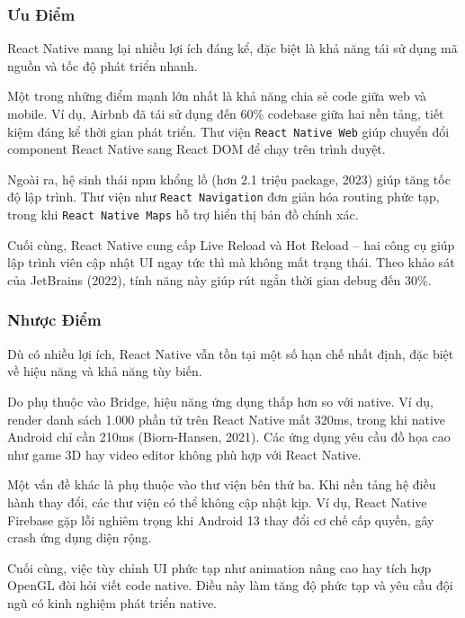 \subsubsection{Ưu Điểm}
\hspace*{1.5em}React Native mang lại nhiều lợi ích đáng kể, đặc biệt là khả năng tái sử dụng mã nguồn và tốc độ phát triển nhanh.

Một trong những điểm mạnh lớn nhất là khả năng chia sẻ code giữa web và mobile.  
Ví dụ, Airbnb đã tái sử dụng đến 60\% codebase giữa hai nền tảng, tiết kiệm đáng kể thời gian phát triển.  
Thư viện \texttt{React Native Web} giúp chuyển đổi component React Native sang React DOM để chạy trên trình duyệt.

Ngoài ra, hệ sinh thái npm khổng lồ (hơn 2.1 triệu package, 2023) giúp tăng tốc độ lập trình.  
Thư viện như \texttt{React Navigation} đơn giản hóa routing phức tạp, trong khi \texttt{React Native Maps} hỗ trợ hiển thị bản đồ chính xác.

Cuối cùng, React Native cung cấp Live Reload và Hot Reload – hai công cụ giúp lập trình viên cập nhật UI ngay tức thì mà không mất trạng thái.  
Theo khảo sát của JetBrains (2022), tính năng này giúp rút ngắn thời gian debug đến 30\%.

\subsubsection{Nhược Điểm}

\hspace*{1.5em}Dù có nhiều lợi ích, React Native vẫn tồn tại một số hạn chế nhất định, đặc biệt về hiệu năng và khả năng tùy biến.

Do phụ thuộc vào Bridge, hiệu năng ứng dụng thấp hơn so với native.  
Ví dụ, render danh sách 1.000 phần tử trên React Native mất 320ms, trong khi native Android chỉ cần 210ms (Biorn-Hansen, 2021).  
Các ứng dụng yêu cầu đồ họa cao như game 3D hay video editor không phù hợp với React Native.

Một vấn đề khác là phụ thuộc vào thư viện bên thứ ba.  
Khi nền tảng hệ điều hành thay đổi, các thư viện có thể không cập nhật kịp.  
Ví dụ, React Native Firebase gặp lỗi nghiêm trọng khi Android 13 thay đổi cơ chế cấp quyền, gây crash ứng dụng diện rộng.

Cuối cùng, việc tùy chỉnh UI phức tạp như animation nâng cao hay tích hợp OpenGL đòi hỏi viết code native.  
Điều này làm tăng độ phức tạp và yêu cầu đội ngũ có kinh nghiệm phát triển native.

